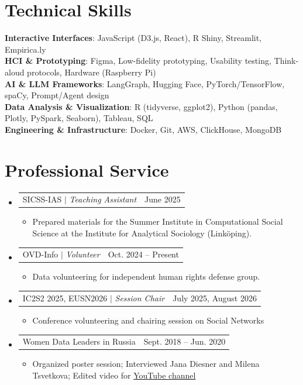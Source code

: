 \documentclass[letterpaper,11pt]{article}
\makeatletter
\newcommand{\headerfont}{\fontfamily{qhv}\selectfont}
\newcommand{\resumeItem}[1]{
  \item\small{
    {#1 \vspace{-2pt}}
  }
}
\newcommand{\resumeProjectHeading}[2]{
    \item
    \begin{tabular*}{\textwidth}[t]{@{}l@{\extracolsep{\fill}}r@{}}
      {\headerfont\color{dark-grey}#1} & {\color{location-grey}\small #2} \\
    \end{tabular*}\vspace{-5pt}
}
\newcommand{\resumeSubHeadingListStart}{\begin{itemize}[leftmargin=0.0in, label={}]}
\newcommand{\resumeSubHeadingListEnd}{\end{itemize}}
\newcommand{\resumeItemListStart}{\begin{itemize}[leftmargin=0.15in, label={-}]}
\newcommand{\resumeItemListEnd}{\end{itemize}\vspace{-5pt}}
\makeatother
\begin{document}
\section{Technical Skills}
 \begin{itemize}[leftmargin=0.15in, label={}]
    \small{\item{
     \textbf{Interactive Interfaces}{: JavaScript (D3.js, React), R Shiny, Streamlit, Empirica.ly} \\
     \textbf{HCI \& Prototyping}{: Figma, Low-fidelity prototyping, Usability testing, Think-aloud protocols, Hardware (Raspberry Pi)} \\
     \textbf{AI \& LLM Frameworks}{: LangGraph, Hugging Face, PyTorch/TensorFlow, spaCy, Prompt/Agent design} \\
     \textbf{Data Analysis \& Visualization}{: R (tidyverse, ggplot2), Python (pandas, Plotly, PySpark, Seaborn), Tableau, SQL} \\
     \textbf{Engineering \& Infrastructure}{: Docker, Git, AWS, ClickHouse, MongoDB}
    }}
 \end{itemize}



\section{Professional Service}
  \resumeSubHeadingListStart
    \resumeProjectHeading
      {SICSS-IAS $|$ \emph{Teaching Assistant}}{June 2025}
      \resumeItemListStart
        \resumeItem{Prepared materials for the Summer Institute in Computational Social Science at the Institute for Analytical Sociology (Linköping).}
      \resumeItemListEnd
    \resumeProjectHeading
      {OVD-Info $|$ \emph{Volunteer}}{Oct. 2024 -- Present}
      \resumeItemListStart
        \resumeItem{Data volunteering for independent human rights defense group.}
        \resumeItemListEnd
    \resumeProjectHeading
      {IC2S2 2025, EUSN2026 $|$ \emph{Session Chair}}{July 2025, August 2026}
      \resumeItemListStart
        \resumeItem{Conference volunteering and chairing session on Social Networks}
        \resumeItemListEnd
    \resumeProjectHeading
      {Women Data Leaders in Russia}{Sept. 2018 -- Jun. 2020}
      \resumeItemListStart
        \resumeItem{Organized poster session; Interviewed Jana Diesner and Milena Tsvetkova; Edited video for \href{https://www.youtube.com/@wdlhse6181/videos}{YouTube channel}}
      \resumeItemListEnd
  \resumeSubHeadingListEnd
\end{document}
